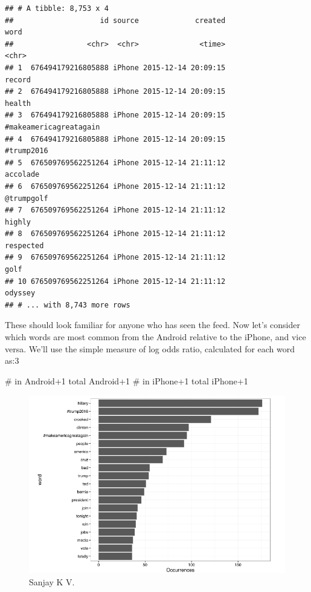\documentclass[a4paper,12pt]{article}
\begin{document}
\begin{lstlisting}
## # A tibble: 8,753 x 4
##                    id source             created                   word
##                 <chr>  <chr>              <time>                  <chr>
## 1  676494179216805888 iPhone 2015-12-14 20:09:15                 record
## 2  676494179216805888 iPhone 2015-12-14 20:09:15                 health
## 3  676494179216805888 iPhone 2015-12-14 20:09:15 #makeamericagreatagain
## 4  676494179216805888 iPhone 2015-12-14 20:09:15             #trump2016
## 5  676509769562251264 iPhone 2015-12-14 21:11:12               accolade
## 6  676509769562251264 iPhone 2015-12-14 21:11:12             @trumpgolf
## 7  676509769562251264 iPhone 2015-12-14 21:11:12                 highly
## 8  676509769562251264 iPhone 2015-12-14 21:11:12              respected
## 9  676509769562251264 iPhone 2015-12-14 21:11:12                   golf
## 10 676509769562251264 iPhone 2015-12-14 21:11:12                odyssey
## # ... with 8,743 more rows
  \end{lstlisting}  
These should look familiar for anyone who has seen the feed. Now let’s consider which words are most common from the Android relative to the iPhone, and vice versa. We’ll use the simple measure of log odds ratio, calculated for each word as:3


# in Android+1
total Android+1
# in iPhone+1
total iPhone+1

  
  \begin{figure}
  \includegraphics[width=\linewidth]{bar-chart.png}
  \caption{Sanjay K V.}
  \label{fig:Tweet words plot}
\end{figure}
\end{document}
